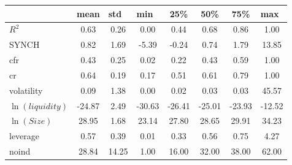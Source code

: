     \begin{tabular}{lccccccc}
    	\hline\hline
	& \multicolumn{1}{l}{mean} & \multicolumn{1}{l}{std} & \multicolumn{1}{l}{min} & 25\%  & 50\%  & 75\%  & \multicolumn{1}{l}{max} \\
	\hline
	$ R^2 $ & 0.63  & 0.26  & 0.00  & 0.44  & 0.68  & 0.86  & 1.00 \\
	SYNCH & 0.82  & 1.69  & -5.39 & -0.24 & 0.74  & 1.79  & 13.85 \\
	cfr   & 0.43  & 0.25  & 0.02  & 0.22  & 0.43  & 0.59  & 1.00 \\
	cr    & 0.64  & 0.19  & 0.17  & 0.51  & 0.61  & 0.79  & 1.00 \\
	volatility & 0.09  & 1.38  & 0.00  & 0.02  & 0.03  & 0.03  & 45.57 \\
	 $ \ln(liquidity) $ & -24.87 & 2.49  & -30.63 & -26.41 & -25.01 & -23.93 & -12.52 \\
	$ \ln(Size) $  & 28.95 & 1.68  & 23.14 & 27.80 & 28.65 & 29.91 & 34.23 \\
	leverage & 0.57  & 0.39  & 0.01  & 0.33  & 0.56  & 0.75  & 4.27 \\
	noind & 28.84 & 14.25 & 1.00  & 16.00 & 32.00 & 38.00 & 62.00 \\
	
	\hline\hline
\end{tabular}%
